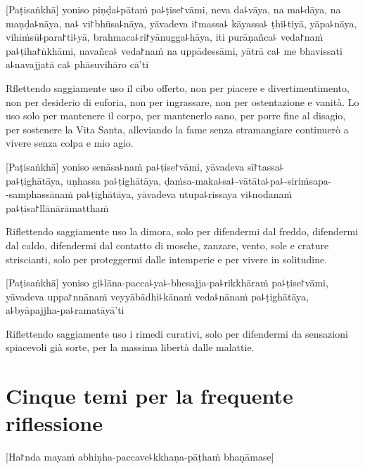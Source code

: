 [Paṭisaṅkhā] yoniso piṇḍa꜕pātaṁ pa꜕ṭise꜓vāmi, neva da꜕vāya, na ma꜕dāya, na maṇḍa꜕nāya, na꜕ vi꜓bhūsa꜕nāya, yāvadeva i꜓massa꜕ kāyassa꜕ ṭhi꜕tiyā, yāpa꜕nāya, vihiṁsū꜕para꜓ti꜕yā, brahmaca꜕ri꜓yānugga꜕hāya, iti purāṇañca꜕ veda꜓naṁ pa꜕ṭiha꜓ṅkhāmi, navañca꜕ veda꜓naṁ na uppādessāmi, yātrā ca꜕ me bhavissati a꜕navajjatā ca꜕ phāsuvihāro cā'ti

\begin{english}
Rflettendo saggiamente uso il cibo offerto, non per piacere e divertimentimento, non per desiderio di euforia, non per ingrassare, non per ostentazione e vanità.
Lo uso solo per mantenere il corpo, per mantenerlo sano, per porre fine al disagio, per sostenere la Vita Santa,
alleviando la fame senza stramangiare continuerò a vivere senza colpa e mio agio.

\end{english}

[Paṭisaṅkhā] yoniso senāsa꜕naṁ pa꜕ṭise꜓vāmi, yāvadeva sī꜓tassa꜕\\
pa꜕ṭighātāya, uṇhassa pa꜕ṭighātāya, ḍaṁsa-maka꜕sa꜕-vātāta꜕pa꜕-siriṁsapa-\\
-samphassānaṁ pa꜕ṭighātāya, yāvadeva utupa꜕rissaya vi꜕nodanaṁ pa꜕ṭisa꜓llānārāmatthaṁ

\begin{english}
Riflettendo saggiamente uso la dimora, solo per difendermi dal freddo, difendermi dal caldo, difendermi dal contatto di mosche, zanzare, vento, sole e crature striscianti, solo per proteggermi dalle intemperie e per vivere in solitudine.
\end{english}

[Paṭisaṅkhā] yoniso gi꜕lāna-pacca꜕ya꜕-bhesajja-pa꜕rikkhāraṁ pa꜕ṭise꜓vāmi, yāvadeva uppa꜓nnānaṁ veyyābādhi꜕kānaṁ veda꜕nānaṁ pa꜕ṭighātāya, a꜕byāpajjha-pa꜕ramatāyā'ti

\begin{english}
Riflettendo saggiamente uso i rimedi curativi, solo per difendermi da sensazioni spiacevoli già sorte, per la massima libertà dalle malattie.
\end{english}

\chapter[Cinque temi]{Cinque temi per la frequente riflessione}


\begin{leader}
  [Ha꜓nda mayaṁ abhiṇha-paccave꜕kkhaṇa-pāṭhaṁ bhaṇāmase]
\end{leader}

